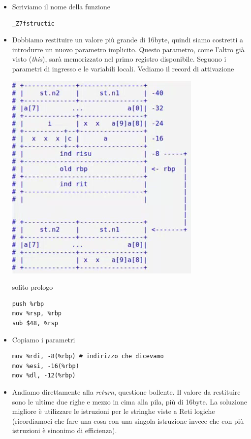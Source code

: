 \documentclass[11pt]{report}
\theoremstyle{definition}
\begin{document}
\begin{itemize}
\item Scriviamo il nome della funzione
\begin{verbatim}
_Z7fstructic
\end{verbatim}
\item Dobbiamo restituire un valore più grande di 16byte, quindi siamo costretti a introdurre un nuovo parametro implicito. Questo parametro, come l'altro già visto (\emph{this}), sarà memorizzato nel primo registro disponibile. Seguono i parametri di ingresso e le variabili locali. Vediamo il record di attivazione
\begin{center}
\includegraphics{img/43.PNG}
\end{center}  
solito prologo
\begin{verbatim}
push %rbp
mov %rsp, %rbp
sub $48, %rsp
\end{verbatim}
\item Copiamo i parametri
\begin{verbatim}
mov %rdi, -8(%rbp) # indirizzo che dicevamo
mov %esi, -16(%rbp) 
mov %dl, -12(%rbp)
\end{verbatim}
\item Andiamo direttamente alla \emph{return}, questione bollente. Il valore da restituire sono le ultime due righe e mezzo in cima alla pila, più di 16byte. La soluzione migliore è utilizzare le istruzioni per le stringhe viste a Reti logiche (ricordiamoci che fare una cosa con una singola istruzione invece che con più istruzioni è sinonimo di efficienza). 
\begin{verbatim}

\end{verbatim}
\end{itemize}
\end{document}
